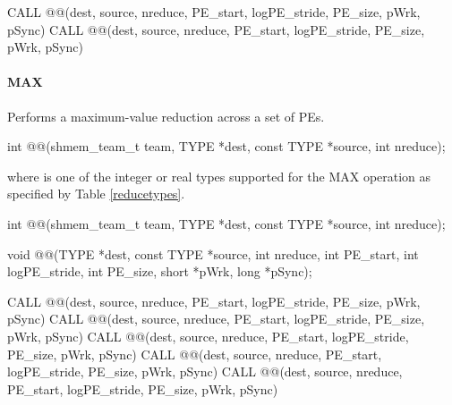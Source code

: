 \begin{apidefinition}
\begin{Fsynopsis}
CALL @@(dest, source, nreduce, PE_start, logPE_stride, PE_size, pWrk, pSync)
CALL @@(dest, source, nreduce, PE_start, logPE_stride, PE_size, pWrk, pSync)
\end{Fsynopsis}

\paragraph{MAX}
Performs a maximum-value reduction across a set of \acp{PE}.\newline

{\color{Green}
\begin{C11synopsis}
int @@(shmem_team_t team, TYPE *dest, const TYPE *source, int nreduce);
\end{C11synopsis}
where \TYPE{} is one of the integer or real types supported for the MAX operation as specified by Table \ref{reducetypes}.
}

\begin{Csynopsis}
\end{Csynopsis}
{\color{Green}
\begin{CsynopsisCol}
int @@(shmem_team_t team, TYPE *dest, const TYPE *source, int nreduce);
\end{CsynopsisCol}
}
\begin{DeprecateBlock}
\begin{CsynopsisCol}
void @@(TYPE *dest, const TYPE *source, int nreduce, int PE_start, int logPE_stride, int PE_size, short *pWrk, long *pSync);
\end{CsynopsisCol}
\end{DeprecateBlock}

\begin{Fsynopsis}
CALL @@(dest, source, nreduce, PE_start, logPE_stride, PE_size, pWrk, pSync)
CALL @@(dest, source, nreduce, PE_start, logPE_stride, PE_size, pWrk, pSync)
CALL @@(dest, source, nreduce, PE_start, logPE_stride, PE_size, pWrk, pSync)
CALL @@(dest, source, nreduce, PE_start, logPE_stride, PE_size, pWrk, pSync)
CALL @@(dest, source, nreduce, PE_start, logPE_stride, PE_size, pWrk, pSync)
\end{Fsynopsis}


\end{apidefinition}
